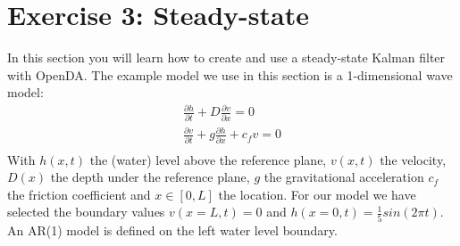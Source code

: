 \documentclass[a4paper,10pt]{article}
\begin{document}


\section{Exercise 3: Steady-state}
  In this section you will learn how to create and use a steady-state Kalman
  filter with OpenDA. The example model we use in this section is a
  1-dimensional wave model:
  \begin{eqnarray}
  \frac{\partial h}{\partial t} + D \frac{\partial v}{\partial x} = 0 \\
  \frac{\partial v}{\partial t} + g \frac{\partial h}{\partial x} + c_f v = 0 \\
  \end{eqnarray}
  With $h(x,t)$ the (water) level above the reference plane, $v(x,t)$ the
  velocity, $D(x)$ the depth under the reference plane, $g$ the gravitational
  acceleration $c_f$ the friction coefficient and $x\in [0,L]$ the location.
  For our model we have selected the boundary values $v(x=L,t)=0$ and
  $h(x=0,t)=\frac{1}{5} sin(2 \pi t)$. An AR(1) model is defined on the left
  water level boundary.
\end{document}
